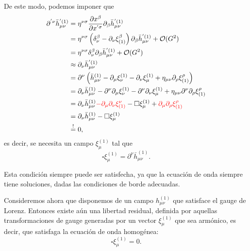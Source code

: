 \documentclass[letterpaper,11pt]{article}
\begin{document}
De este modo, podemos imponer que
\begin{align}
\partial^{'\nu} \bar{h}_{\mu\nu}^{'(1)} &= \eta^{\nu \sigma} \frac{\partial x^{\beta}}{\partial x^{'\sigma}} \partial_{\beta} \bar{h}_{\mu\nu}^{'(1)} \nonumber\\
&= \eta^{\nu \sigma}  \left(\delta_{\nu}^{\beta} - \partial_{\nu} \xi_{(1)}^{\beta} \right) \partial_{\beta} \bar{h}_{\mu\nu}^{'(1)} + \mathcal{O}(G^2) \nonumber \\
&=\eta^{\nu \sigma} \delta_{\nu}^{\beta} \partial_{\beta} \bar{h}_{\mu\nu}^{'(1)} + \mathcal{O}(G^2) \nonumber \\
&\approx \partial_{\nu} \bar{h}_{\mu\nu}^{'(1)} \nonumber  \\
&= \partial^{\nu} \left(\bar{h}_{\mu\nu}^{(1)}  - \partial_{\mu} \xi_{\nu}^{(1)} - \partial_{\nu} \xi_{\mu}^{(1)} + \eta_{\mu\nu} \partial_{\rho} \xi^{\rho}_{(1)} \right) \nonumber  \\
&= \partial_{\nu} \bar{h}_{\mu\nu}^{(1)} -  \partial^{\nu} \partial_{\mu} \xi_{\nu}^{(1)}  - \partial^{\nu} \partial_{\nu} \xi_{\mu}^{(1)} + \eta_{\mu\nu} \partial^{\nu} \partial_{\rho} \xi^{\rho}_{(1)} \nonumber  \\
&= \partial_{\nu} \bar{h}_{\mu\nu}^{(1)} \textcolor{red}{- \partial_{\mu} \partial_{\nu} \xi^{\nu}_{(1)}}  - \square \xi_{\mu}^{(1)} + \textcolor{red}{\partial_{\mu} \partial_{\rho} \xi^{\rho}_{(1)}} \nonumber  \\
&=  \partial_{\nu} \bar{h}_{\mu\nu}^{(1)}- \square \xi_{\mu}^{(1)} \nonumber \\
&\stackrel{!}{=} 0,
\end{align}
es decir, se necesita un campo $\xi_{\mu}^{(1)}$ tal que 
\begin{equation}
\square \xi_{\mu}^{(1)} = \partial^{\nu} \bar{h}_{\mu\nu}^{(1)}. \label{eq:wave-eq-gauge}
\end{equation}

Esta condición siempre puede ser satisfecha, ya que la ecuación de onda siempre tiene soluciones, dadas las condiciones de borde adecuadas.

Consideremos ahora que disponemos de un campo $h_{\mu\nu}^{(1)}$ que satisface el gauge de Lorenz. Entonces existe aún una libertad residual, definida por aquellas transformaciones de gauge generadas por un vector $\xi_{\mu}^{(1)}$ que sea armónico, es decir, que satisfaga la ecuación de onda homogénea:
\begin{equation}
\square \xi_{\mu}^{(1)} = 0. \label{eq:gauge-8.5}
\end{equation}
\end{document}
